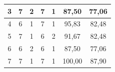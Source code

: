 \begin{table}[H]
\begin{tabular}{|ccccc|c|c|}
		\multicolumn{1}{|c|}{3}                                 & \multicolumn{1}{c|}{7}                                                                          & \multicolumn{1}{c|}{2}                                                                          & \multicolumn{1}{c|}{7}                                                                          & 1                                                  & 87,50                                                & 77,06                                                     \\ \hline
		\multicolumn{1}{|c|}{4}                                 & \multicolumn{1}{c|}{6}                                                                          & \multicolumn{1}{c|}{1}                                                                          & \multicolumn{1}{c|}{7}                                                                          & 1                                                  & 95,83                                                & 82,48                                                     \\ \hline
		\multicolumn{1}{|c|}{5}                                 & \multicolumn{1}{c|}{7}                                                                          & \multicolumn{1}{c|}{1}                                                                          & \multicolumn{1}{c|}{6}                                                                          & 2                                                  & 91,67                                                & 82,48                                                     \\ \hline
		\multicolumn{1}{|c|}{6}                                 & \multicolumn{1}{c|}{6}                                                                          & \multicolumn{1}{c|}{2}                                                                          & \multicolumn{1}{c|}{6}                                                                          & 1                                                  & 87,50                                                & 77,06                                                     \\ \hline
		\multicolumn{1}{|c|}{7}                                 & \multicolumn{1}{c|}{7}                                                                          & \multicolumn{1}{c|}{1}                                                                          & \multicolumn{1}{c|}{7}                                                                          & 1                                                  & 100,00                                               & 87,90                                                     \\ \hline

\end{tabular}
\end{table}
